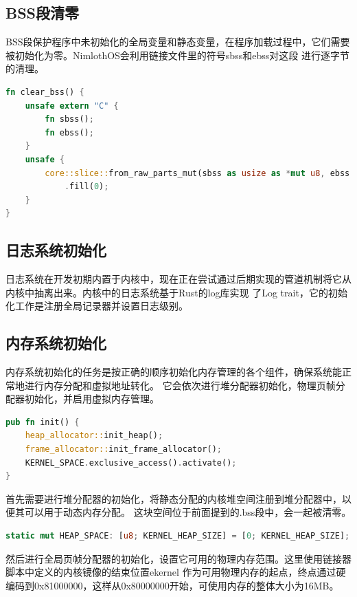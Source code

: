 \subsection{BSS段清零}

BSS段保护程序中未初始化的全局变量和静态变量，在程序加载过程中，它们需要被初始化为零。NimlothOS会利用链接文件里的符号sbss和ebss对这段
进行逐字节的清理。

\begin{lstlisting}[language=Rust,caption={bss段清零}, label={lst:bss-clear}]
fn clear_bss() {
    unsafe extern "C" {
        fn sbss();
        fn ebss();
    }
    unsafe {
        core::slice::from_raw_parts_mut(sbss as usize as *mut u8, ebss as usize - sbss as usize)
            .fill(0);
    }
}
\end{lstlisting}

\subsection{日志系统初始化}
日志系统在开发初期内置于内核中，现在正在尝试通过后期实现的管道机制将它从内核中抽离出来。内核中的日志系统基于Rust的log库实现
了Log trait，它的初始化工作是注册全局记录器并设置日志级别。

\subsection{内存系统初始化}
内存系统初始化的任务是按正确的顺序初始化内存管理的各个组件，确保系统能正常地进行内存分配和虚拟地址转化。
它会依次进行堆分配器初始化，物理页帧分配器初始化，并启用虚拟内存管理。

\begin{lstlisting}[language=Rust,caption={内存系统初始化}, label={lst:memory-init}]
pub fn init() {
    heap_allocator::init_heap();
    frame_allocator::init_frame_allocator();
    KERNEL_SPACE.exclusive_access().activate();
}
\end{lstlisting}

首先需要进行堆分配器的初始化，将静态分配的内核堆空间注册到堆分配器中，以便其可以用于动态内存分配。
这块空间位于前面提到的.bss段中，会一起被清零。

\begin{lstlisting}[language=Rust,caption={内核堆空间}, label={lst:heap-space}]
static mut HEAP_SPACE: [u8; KERNEL_HEAP_SIZE] = [0; KERNEL_HEAP_SIZE];
\end{lstlisting}

然后进行全局页帧分配器的初始化，设置它可用的物理内存范围。这里使用链接器脚本中定义的内核镜像的结束位置ekernel
作为可用物理内存的起点，终点通过硬编码到0x81000000，这样从0x80000000开始，可使用内存的整体大小为16MB。

